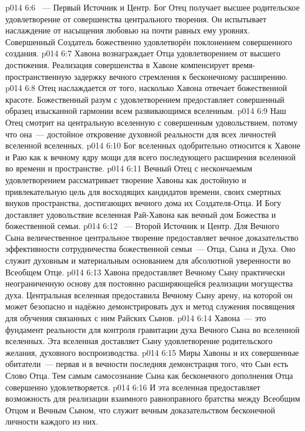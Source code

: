 \vs p014 6:6 ~--- Первый Источник и Центр. Бог Отец получает высшее родительское удовлетворение от совершенства центрального творения. Он испытывает наслаждение от насыщения любовью на почти равных ему уровнях. Совершенный Создатель божественно удовлетворён поклонением совершенного создания.
\vs p014 6:7 Хавона вознаграждает Отца удовлетворением от высшего достижения. Реализация совершенства в Хавоне компенсирует время\hyp{}пространственную задержку вечного стремления к бесконечному расширению.
\vs p014 6:8 Отец наслаждается от того, насколько Хавона отвечает божественной красоте. Божественный разум с удовлетворением предоставляет совершенный образец изысканной гармонии всем развивающимся вселенным.
\vs p014 6:9 Наш Отец смотрит на центральную вселенную с совершенным удовольствием, потому что она~--- достойное откровение духовной реальности для всех личностей вселенной вселенных.
\vs p014 6:10 Бог вселенных одобрительно относится к Хавоне и Раю как к вечному ядру мощи для всего последующего расширения вселенной во времени и пространстве.
\vs p014 6:11 Вечный Отец с нескончаемым удовлетворением рассматривает творение Хавоны как достойную и привлекательную цель для восходящих кандидатов времени, своих смертных внуков пространства, достигающих вечного дома их Создателя\hyp{}Отца. И Богу доставляет удовольствие вселенная Рай\hyp{}Хавона как вечный дом Божества и божественной семьи.
\vs p014 6:12 ~--- Второй Источник и Центр. Для Вечного Сына величественное центральное творение предоставляет вечное доказательство эффективности сотрудничества божественной семьи~--- Отца, Сына и Духа. Оно служит духовным и материальным основанием для абсолютной уверенности во Всеобщем Отце.
\vs p014 6:13 Хавона предоставляет Вечному Сыну практически неограниченную основу для постоянно расширяющейся реализации могущества духа. Центральная вселенная предоставила Вечному Сыну арену, на которой он может безопасно и надёжно демонстрировать дух и метод служения посвящения для обучения связанных с ним Райских Сынов.
\vs p014 6:14 Хавона~--- это фундамент реальности для контроля гравитации духа Вечного Сына во вселенной вселенных. Эта вселенная доставляет Сыну удовлетворение родительского желания, духовного воспроизводства.
\vs p014 6:15 Миры Хавоны и их совершенные обитатели~--- первая и в вечности последняя демонстрация того, что Сын есть Слово Отца. Тем самым самосознание Сына как бесконечного дополнения Отца совершенно удовлетворяется.
\vs p014 6:16 И эта вселенная предоставляет возможность для реализации взаимного равноправного братства между Всеобщим Отцом и Вечным Сыном, что служит вечным доказательством бесконечной личности каждого из них.
